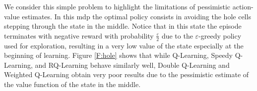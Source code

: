 We consider this simple problem to highlight the limitations of pessimistic action-value estimates. In this \gls{mdp} the optimal policy consists in avoiding the hole cells stepping through the state in the middle. Notice that in this state the episode terminates with negative reward with probability $\frac{\varepsilon}{2}$ due to the $\varepsilon$-greedy policy used for exploration, resulting in a very low value of the state especially at the beginning of learning. Figure \ref{F:hole} shows that while Q-Learning, Speedy Q-Learning, and RQ-Learning behave similarly well, Double Q-Learning and Weighted Q-Learning obtain very poor results due to the pessimistic estimate of the value function of the state in the middle.
\begin{figure}[t]
\begin{minipage}{\columnwidth}
\centering

\end{minipage}
\end{figure}
